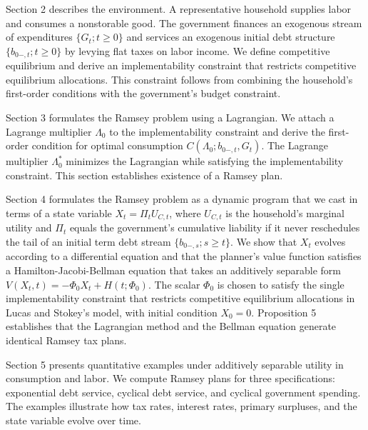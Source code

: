 \documentclass[12pt]{article}
\newcommand{\WJ}[1]{{\textcolor{red}{#1}}}
\begin{document}
{Section 2 describes the environment. A representative household supplies labor and consumes a nonstorable good. The government finances an exogenous stream of expenditures $\{G_t; t \geq 0\}$ and services an exogenous initial debt structure $\{b_{0-,t}; t \geq 0\}$ by levying flat taxes on labor income. We define competitive equilibrium and derive an implementability constraint that restricts competitive equilibrium allocations. This constraint follows from combining the household's first-order conditions with the government's budget constraint.

Section 3 formulates the Ramsey problem using a Lagrangian. We attach a Lagrange multiplier $\Lambda_0$ to the implementability constraint and derive the first-order condition for optimal consumption $C(\Lambda_0; b_{0-,t}, G_t)$. The Lagrange multiplier $\Lambda_0^*$ minimizes the Lagrangian while satisfying the implementability constraint. This section establishes existence of a Ramsey plan. %

Section 4 formulates the Ramsey problem as a dynamic program {that we cast in terms of   a state variable $X_t = \Pi_t U_{C,t}$, where $U_{C,t}$ is the household's marginal utility and  $\Pi_t$ equals the government's  cumulative liability if it never reschedules the tail of an initial term debt stream $\{b_{0-,s}; s \geq t\}$.} We show that $X_t$ evolves according to a differential equation and that the planner's value function satisfies a Hamilton-Jacobi-Bellman equation that takes an additively separable form $V(X_t,t) = -\Phi_0 X_t + H(t;\Phi_0)$. The scalar $\Phi_0$ is chosen to satisfy the single implementability constraint that restricts competitive equilibrium allocations in Lucas and Stokey's model,  with initial condition $X_0 = 0$. Proposition 5 establishes that the Lagrangian method and the Bellman equation generate identical Ramsey tax plans.

{Section 5 presents quantitative examples under additively separable utility in consumption and labor.} We compute Ramsey plans for three specifications: exponential debt service, cyclical debt service, and cyclical government spending. The examples illustrate how tax rates, interest rates, primary surpluses, and the state variable evolve over time.


}
\end{document}
